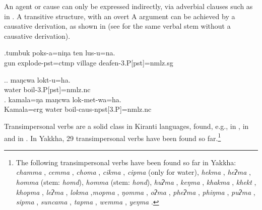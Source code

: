  An agent or cause can only be expressed indirectly, via adverbial clauses such as in \Next. A transitive structure, with an overt A argument can be achieved by a causative derivation, as shown in \NNext[b] (see \Next[a] for the same verbal stem without a causative derivation). 
 
 \exg.tumbuk poks-a=niŋa ten lus-u=na.\\
gun explode{\sc [3sg]-pst=ctmp} village  deafen{\sc -3.P[pst]=nmlz.sg}\\


 
\ex.\ag. maŋcwa lokt-u=ha.\\
water boil{\sc -3.P[pst]=nmlz.nc}\\
\bg. kamala=ŋa maŋcwa lok-met-wa=ha.\\
Kamala{\sc =erg} water boil{\sc -caus-npst[3.P]=nmlz.nc}\\


Transimpersonal verbs are a solid class in Kiranti languages, found, e.g., in  \citep[451]{Driem1987A-grammar}, in  \citep[42]{Allen1975Sketch} and in  \citep[222]{Doornenbal2009A-grammar}. In Yakkha, 29 transimpersonal verbs have been found so far.\footnote{The following transimpersonal verbs have been found so far in Yakkha: \emph{chamma} , \emph{cemma} , \emph{choma} , \emph{cikma} ,  \emph{cipma}  (only for water),  \emph{hekma} , \emph{heʔma} , \emph{homma} (stem: \emph{homd}), \emph{homma}  (stem: \emph{hond}), \emph{huʔma} , \emph{keŋma} , \emph{khakma} , \emph{khekt} , \emph{khopma} , \emph{leʔma} ,   \emph{lokma} ,\emph{mopma} , \emph{ŋomma} ,   \emph{oʔma} ,  \emph{pheʔma} , \emph{phiŋma} , \emph{puʔma} ,   \emph{sipma} , 
 \emph{suncama} , \emph{tapma} , \emph{wemma} , \emph{yeŋma} .} 




